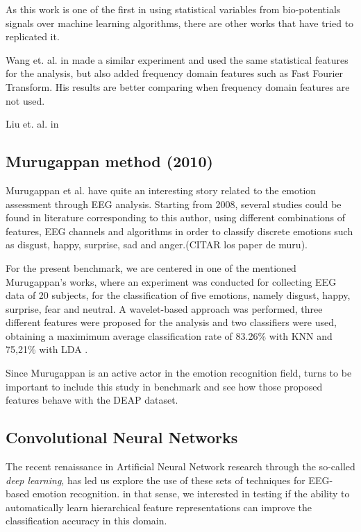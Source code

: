\documentclass{sig-alternate}
\begin{document}
As this work is one of the first in using statistical variables from 
bio-potentials signals over machine learning algorithms, there are other works
that have tried to replicated it. 

Wang et. al. in \cite{wang2011} made a similar experiment
and used the same statistical features for the analysis, but also 
added frequency domain features such as Fast Fourier Transform. His
results are better comparing when frequency domain features are not used.

Liu et. al. in \cite{liu2013}

\subsection{Murugappan method (2010)}	

Murugappan et al. have quite an interesting story related to the emotion assessment through EEG analysis. Starting from 2008, several studies could be found in literature corresponding to this author, using different combinations of features, EEG channels and algorithms in order to classify discrete emotions such as disgust, happy, surprise, sad and anger.(CITAR los paper de muru).

For the present benchmark, we are centered in one of the mentioned Murugappan's works, where an experiment was conducted for collecting EEG data of 20 subjects, for the classification of five emotions, namely disgust, happy, surprise, fear and neutral. A wavelet-based approach was performed, three different features were proposed for the analysis and two classifiers were used, obtaining a maximimum average classification rate of 83.26\% with KNN and 75,21\% with LDA \cite{Murugappan2010Classification}.

Since Murugappan is an active actor in the emotion recognition field, turns to be important to include this study in benchmark and see how those proposed features behave with the DEAP dataset.

\subsection{Convolutional Neural Networks}

The recent renaissance in Artificial Neural Network research 
through the so-called \emph{deep learning}, has led us explore 
the use of these sets of techniques for EEG-based emotion 
recognition. in that sense, we interested in testing if the ability
to automatically learn  hierarchical feature representations can
improve the classification accuracy in this domain. 
\end{document}
